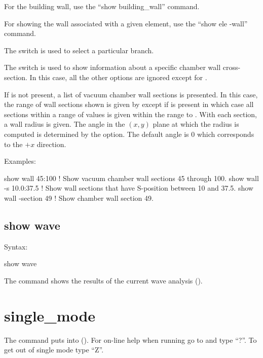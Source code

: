 {{{{{{For the building wall, use the ``show building_wall'' command.

For showing the wall associated with a given element, use the ``show ele -wall'' command.

The  switch is used to select a particular branch.

The  switch is used to show information about a specific chamber wall
cross-section. In this case, all the other options are ignored except for .

If  is not present, a list of vacuum chamber wall sections is presented. In
this case, the range of wall sections shown is given by  except if 
is present in which case all sections within a range of  values is given within the
range  to . With each section, a wall radius is given. The angle in the
$(x,y)$ plane at which the radius is computed is determined by the  option. The
default angle is 0 which corresponds to the $+x$ direction.

Examples:
\begin{example}
  show wall 45:100       ! Show vacuum chamber wall sections 45 through 100.
  show wall -s 10.0:37.5 ! Show wall sections that have S-position between 10 and 37.5.
  show wall -section 49  ! Show chamber wall section 49.
\end{example}


\subsection{show wave}
\label{s:show.wave}

Syntax:
\begin{example}
  show wave
\end{example}

The  command shows the results of the current wave analysis ().

\section{single_mode}
\label{s:sing}

The  command puts \tao into  ().
For on-line help when running \tao go to  and type ``?''.
To get out of single mode type ``Z''.

}}}}}}
